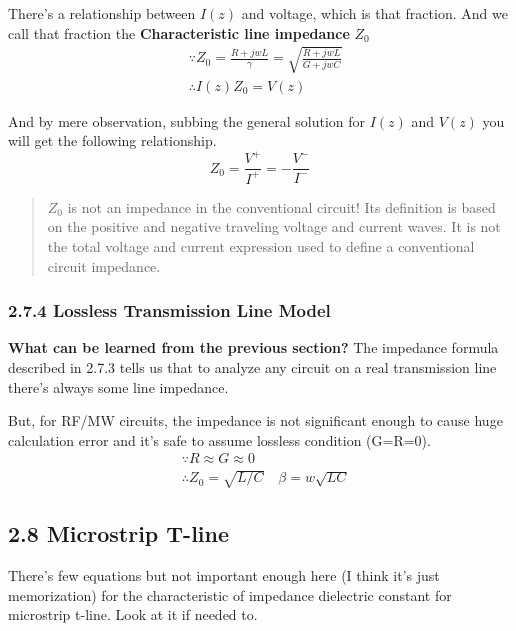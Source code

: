 \documentclass[11pt]{article}
\begin{document}
    There's a relationship between \(I(z)\) and voltage, which is that
fraction. And we call that fraction the \textbf{Characteristic line
impedance} \(Z_0\) \[
\begin{align}
&\because Z_0 = \frac{R+jwL}{\gamma} = \sqrt{\frac{R+jwL}{G+jwC}} \\
&\therefore I(z)Z_0 = V(z)
\end{align}\]

    And by mere observation, subbing the general solution for \(I(z)\) and
\(V(z)\) you will get the following relationship. \[
Z_0 = \frac{V^+}{I^+} = -\frac{V^-}{I^-}
\]

    \begin{quote}
\(Z_0\) is not an impedance in the conventional circuit! Its definition
is based on the positive and negative traveling voltage and current
waves. It is not the total voltage and current expression used to define
a conventional circuit impedance.
\end{quote}

    \hypertarget{lossless-transmission-line-model}{%
\subsubsection{2.7.4 Lossless Transmission Line
Model}\label{lossless-transmission-line-model}}

\textbf{What can be learned from the previous section?} The impedance
formula described in 2.7.3 tells us that to analyze any circuit on a
real transmission line there's always some line impedance.

But, for RF/MW circuits, the impedance is not significant enough to
cause huge calculation error and it's safe to assume lossless condition
(G=R=0). \[
\begin{align}
    &\because R \approx G \approx 0 \\
    &\therefore Z_0 = \sqrt{L/C} \quad \beta = w\sqrt{LC}
\end{align}\]

    \hypertarget{microstrip-t-line}{%
\subsection{2.8 Microstrip T-line}\label{microstrip-t-line}}

There's few equations but not important enough here (I think it's just
memorization) for the characteristic of impedance dielectric constant
for microstrip t-line. Look at it if needed to.
\end{document}
